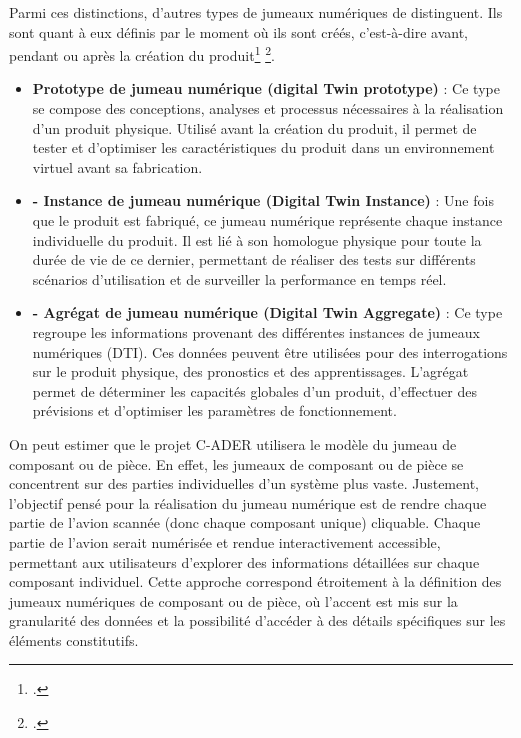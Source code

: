 Parmi ces distinctions, d’autres types de jumeaux numériques de distinguent. Ils sont quant à eux définis par le moment où ils sont créés, c'est-à-dire avant, pendant ou après la création du produit\footcite{DigitalTwin2024} \footcite{rebecchiQuEstceQue2021}.\\

\begin{itemize}
    \item \textbf{Prototype de jumeau numérique (digital Twin prototype)} : Ce type se compose des conceptions, analyses et processus nécessaires à la réalisation d'un produit physique. Utilisé avant la création du produit, il permet de tester et d'optimiser les caractéristiques du produit dans un environnement virtuel avant sa fabrication.
    \item \textbf{-	Instance de jumeau numérique (Digital Twin Instance)} : Une fois que le produit est fabriqué, ce jumeau numérique représente chaque instance individuelle du produit. Il est lié à son homologue physique pour toute la durée de vie de ce dernier, permettant de réaliser des tests sur différents scénarios d'utilisation et de surveiller la performance en temps réel.
    \item \textbf{-	Agrégat de jumeau numérique (Digital Twin Aggregate)} : Ce type regroupe les informations provenant des différentes instances de jumeaux numériques (DTI). Ces données peuvent être utilisées pour des interrogations sur le produit physique, des pronostics et des apprentissages. L'agrégat permet de déterminer les capacités globales d'un produit, d'effectuer des prévisions et d'optimiser les paramètres de fonctionnement.\\
\end{itemize}

On peut estimer que le projet C-ADER utilisera le modèle du jumeau de composant ou de pièce. En effet, les jumeaux de composant ou de pièce se concentrent sur des parties individuelles d'un système plus vaste. Justement, l’objectif pensé pour la réalisation du jumeau numérique est de rendre chaque partie de l'avion scannée (donc chaque composant unique) cliquable. Chaque partie de l'avion serait numérisée et rendue interactivement accessible, permettant aux utilisateurs d'explorer des informations détaillées sur chaque composant individuel. Cette approche correspond étroitement à la définition des jumeaux numériques de composant ou de pièce, où l'accent est mis sur la granularité des données et la possibilité d'accéder à des détails spécifiques sur les éléments constitutifs.\\

